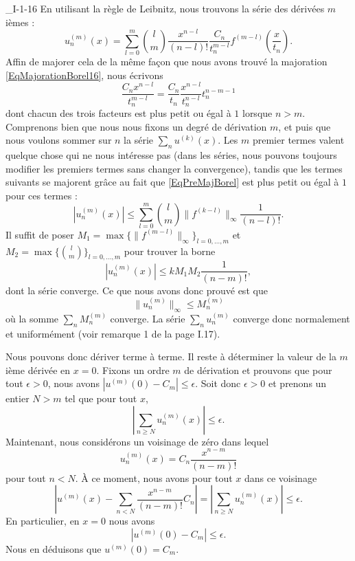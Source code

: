\begin{corrige}{_I-1-16}
En utilisant la règle de Leibnitz, nous trouvons la série des dérivées $m$ièmes :
\begin{equation}
	u_n^{(m)}(x)=\sum_{l=0}^m {l\choose m} \frac{ x^{n-l} }{ (n-l)! }\frac{ C_n }{ t_n^{m-l} }f^{(m-l)}(\frac{ x }{ t_n }).
\end{equation}
Affin de majorer cela de la même façon que nous avons trouvé la majoration \eqref{EqMajorationBorel16}, nous écrivons
\begin{equation}		\label{EqPreMajBorel}
	\frac{ C_nx^{n-l} }{ t_n^{m-l} }=\frac{ C_n }{ t_n }\frac{ x^{n-l} }{ t_n^{n-l} }t_n^{n-m-1}
\end{equation}
dont chacun des trois facteurs est plus petit ou égal à $1$ lorsque $n>m$. Comprenons bien que nous nous fixons un degré de dérivation $m$, et puis que nous voulons sommer sur $n$ la série $\sum_n u^{(k)}(x)$. Les $m$ premier termes valent quelque chose qui ne nous intéresse pas (dans les séries, nous pouvons toujours modifier les premiers termes sans changer la convergence), tandis que les termes suivants se majorent grâce au fait que \eqref{EqPreMajBorel} est plus petit ou égal à $1$ pour ces termes :
\begin{equation}
	| u_n^{(m)}(x) |\leq \sum_{l=0}^m{l\choose m} \| f^{(k-l)} \|_{\infty}\frac{1}{ (n-l)! }.
\end{equation}
Il suffit de poser $M_1=\max\{ \| f^{(m-l)} \|_{\infty} \}_{l=0,\ldots,m}$ et $M_2=\max\{ {l\choose m} \}_{l=0,\ldots,m}$ pour trouver la borne
\begin{equation}
	| u_n^{(m)}(x) |\leq kM_1M_2\frac{1}{ (n-m)! }, 
\end{equation}
dont la série converge. Ce que nous avons donc prouvé est que
\begin{equation}
	\| u_n^{(m)} \|_{\infty}\leq M_n^{(m)}
\end{equation}
où la somme $\sum_nM_n^{(m)}$ converge. La série $\sum_nu_n^{(m)}$ converge donc normalement et uniformément (voir remarque 1 de la page I.17).

Nous pouvons donc dériver terme à terme. Il reste à déterminer la valeur de la $m$ième dérivée en $x=0$. Fixons un ordre $m$ de dérivation et prouvons que pour tout $\epsilon>0$, nous avons $| u^{(m)}(0)-C_m |\leq \epsilon$. Soit donc $\epsilon>0$ et prenons un entier $N>m$ tel que pour tout $x$,
\begin{equation}
	\left| \sum_{n\geq N}u_n^{(m)}(x) \right| \leq \epsilon.
\end{equation}
Maintenant, nous considérons un voisinage de zéro dans lequel
\begin{equation}
	u_n^{(m)}(x)=C_n\frac{ x^{n-m} }{ (n-m)! }
\end{equation}
pour tout $n<N$. À ce moment, nous avons pour tout $x$ dans ce voisinage
\begin{equation}
	\left| u^{(m)}(x)-\sum_{n<N}\frac{ x^{n-m} }{ (n-m)! }C_n \right| =\left| \sum_{n\geq N}u_n^{(m)}(x) \right| \leq\epsilon.
\end{equation}
En particulier, en $x=0$ nous avons
\begin{equation}
	| u^{(m)}(0)-C_m |\leq\epsilon.
\end{equation}
Nous en déduisons que $u^{(m)}(0)=C_m$.



\end{corrige}
